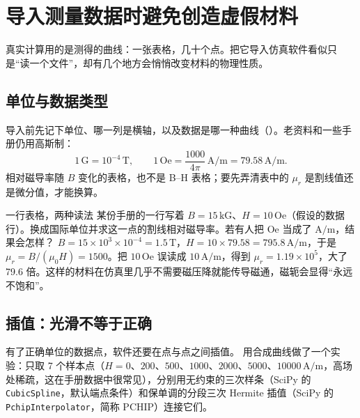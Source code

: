 \section{导入测量数据时避免创造虚假材料}\label{sec:bh-data}

真实计算用的是测得的曲线：一张表格，几十个点。把它导入仿真软件看似只是“读一个文件”，却有几个地方会悄悄改变材料的物理性质。

\subsection{单位与数据类型}
导入前先记下单位、哪一列是横轴，以及数据是哪一种曲线（）。老资料和一些手册仍用高斯制：
\begin{equation*}
1\,\mathrm{G}=10^{-4}\,\mathrm T,\qquad 1\,\mathrm{Oe}=\frac{1000}{4\pi}\,\mathrm{A/m}=79.58\,\mathrm{A/m}.
\end{equation*}
相对磁导率随 $B$ 变化的表格，也不是 B--H 表格；要先弄清表中的 $\mu_r$ 是割线值还是微分值，才能换算。

\begin{example}[label=ex:bh-units]{一行表格，两种读法}
某份手册的一行写着 $B=15\,\mathrm{kG}$、$H=10\,\mathrm{Oe}$（假设的数据行）。换成国际单位并求这一点的割线相对磁导率。若有人把 $\mathrm{Oe}$ 当成了 $\mathrm{A/m}$，结果会怎样？
\solution
$B=15\times10^3\times10^{-4}=1.5\,\mathrm T$，$H=10\times79.58=795.8\,\mathrm{A/m}$，于是 $\mu_r=B/(\mu_0H)=1500$。把 $10\,\mathrm{Oe}$ 误读成 $10\,\mathrm{A/m}$，得到 $\mu_r=1.19\times10^5$，大了 79.6 倍。这样的材料在仿真里几乎不需要磁压降就能传导磁通，磁轭会显得“永远不饱和”。
\end{example}

\subsection{插值：光滑不等于正确}
有了正确单位的数据点，软件还要在点与点之间插值。 用合成曲线做了一个实验：只取 7 个样本点（$H=0$、$200$、$500$、$1000$、$2000$、$5000$、$10000\,\mathrm{A/m}$，高场处稀疏，这在手册数据中很常见），分别用无约束的三次样条（SciPy 的 \texttt{CubicSpline}，默认端点条件）和保单调的分段三次 Hermite 插值（SciPy 的 \texttt{PchipInterpolator}，简称 PCHIP\cite{fritsch}）连接它们。



